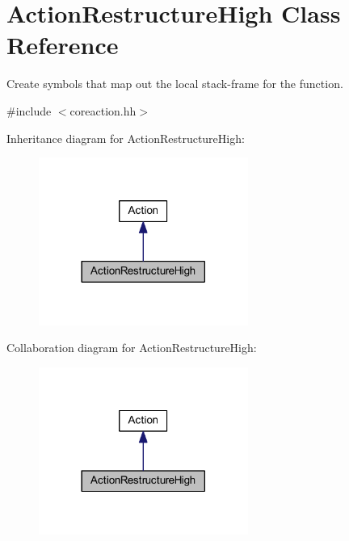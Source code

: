 \hypertarget{class_action_restructure_high}{}\section{Action\+Restructure\+High Class Reference}
\label{class_action_restructure_high}


Create symbols that map out the local stack-\/frame for the function.  




{\ttfamily \#include $<$coreaction.\+hh$>$}



Inheritance diagram for Action\+Restructure\+High\+:
\nopagebreak
\begin{figure}[H]
\begin{center}
\leavevmode
\includegraphics[width=194pt]{class_action_restructure_high__inherit__graph}
\end{center}
\end{figure}


Collaboration diagram for Action\+Restructure\+High\+:
\nopagebreak
\begin{figure}[H]
\begin{center}
\leavevmode
\includegraphics[width=194pt]{class_action_restructure_high__coll__graph}
\end{center}
\end{figure}
